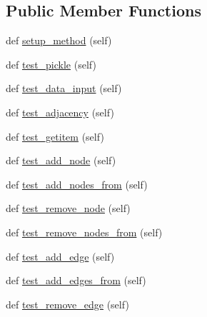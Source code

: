 \subsection*{Public Member Functions}
\begin{DoxyCompactItemize}
\item 
def \hyperlink{classnetworkx_1_1classes_1_1tests_1_1test__graph_1_1TestGraph_aa159469df42ef1736ecedf4fcaf6eaa9}{setup\+\_\+method} (self)
\item 
def \hyperlink{classnetworkx_1_1classes_1_1tests_1_1test__graph_1_1TestGraph_a4c1c0b99dee18fa730a32d404c95fe74}{test\+\_\+pickle} (self)
\item 
def \hyperlink{classnetworkx_1_1classes_1_1tests_1_1test__graph_1_1TestGraph_af3dd36e96f2254893033b1ed38b30384}{test\+\_\+data\+\_\+input} (self)
\item 
def \hyperlink{classnetworkx_1_1classes_1_1tests_1_1test__graph_1_1TestGraph_a6bf2226043a2f35b7abf92766cda2bf0}{test\+\_\+adjacency} (self)
\item 
def \hyperlink{classnetworkx_1_1classes_1_1tests_1_1test__graph_1_1TestGraph_a5c4dc80a00297ee8b8df859b419000eb}{test\+\_\+getitem} (self)
\item 
def \hyperlink{classnetworkx_1_1classes_1_1tests_1_1test__graph_1_1TestGraph_a9e26beb84b307436160c06ead33caea9}{test\+\_\+add\+\_\+node} (self)
\item 
def \hyperlink{classnetworkx_1_1classes_1_1tests_1_1test__graph_1_1TestGraph_acfb9be361b2adde9fd8e227e5981a5a9}{test\+\_\+add\+\_\+nodes\+\_\+from} (self)
\item 
def \hyperlink{classnetworkx_1_1classes_1_1tests_1_1test__graph_1_1TestGraph_acd63559e9ceabf0a18aa37625ce50a9c}{test\+\_\+remove\+\_\+node} (self)
\item 
def \hyperlink{classnetworkx_1_1classes_1_1tests_1_1test__graph_1_1TestGraph_a2019812a27b0dd19419d5a0a639ccaad}{test\+\_\+remove\+\_\+nodes\+\_\+from} (self)
\item 
def \hyperlink{classnetworkx_1_1classes_1_1tests_1_1test__graph_1_1TestGraph_a1687f7186f04c16abd967d272e07bb78}{test\+\_\+add\+\_\+edge} (self)
\item 
def \hyperlink{classnetworkx_1_1classes_1_1tests_1_1test__graph_1_1TestGraph_a99786ae627d3cb529478e409bc204a95}{test\+\_\+add\+\_\+edges\+\_\+from} (self)
\item 
def \hyperlink{classnetworkx_1_1classes_1_1tests_1_1test__graph_1_1TestGraph_a78b1a84c2b989d2f57d60a900e068945}{test\+\_\+remove\+\_\+edge} (self)
\item 

\end{DoxyCompactItemize}
